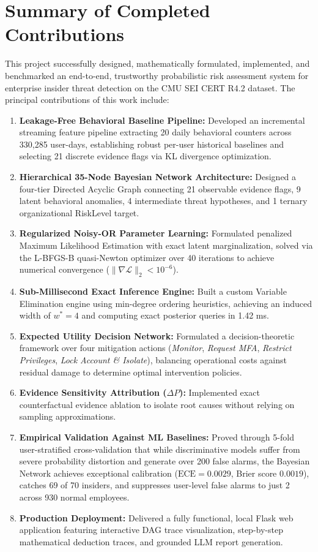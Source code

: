 \documentclass[12pt,a4paper]{report}
\begin{document}
\section{Summary of Completed Contributions}
This project successfully designed, mathematically formulated, implemented, and benchmarked an end-to-end, trustworthy probabilistic risk assessment system for enterprise insider threat detection on the CMU SEI CERT R4.2 dataset. The principal contributions of this work include:
\begin{enumerate}
    \item \textbf{Leakage-Free Behavioral Baseline Pipeline:} Developed an incremental streaming feature pipeline extracting 20 daily behavioral counters across 330,285 user-days, establishing robust per-user historical baselines and selecting 21 discrete evidence flags via KL divergence optimization.
    \item \textbf{Hierarchical 35-Node Bayesian Network Architecture:} Designed a four-tier Directed Acyclic Graph connecting 21 observable evidence flags, 9 latent behavioral anomalies, 4 intermediate threat hypotheses, and 1 ternary organizational RiskLevel target.
    \item \textbf{Regularized Noisy-OR Parameter Learning:} Formulated penalized Maximum Likelihood Estimation with exact latent marginalization, solved via the L-BFGS-B quasi-Newton optimizer over 40 iterations to achieve numerical convergence ($\|\nabla \mathcal{L}\|_2 < 10^{-6}$).
    \item \textbf{Sub-Millisecond Exact Inference Engine:} Built a custom Variable Elimination engine using min-degree ordering heuristics, achieving an induced width of $w^* = 4$ and computing exact posterior queries in 1.42 ms.
    \item \textbf{Expected Utility Decision Network:} Formulated a decision-theoretic framework over four mitigation actions (\textit{Monitor}, \textit{Request MFA}, \textit{Restrict Privileges}, \textit{Lock Account \& Isolate}), balancing operational costs against residual damage to determine optimal intervention policies.
    \item \textbf{Evidence Sensitivity Attribution ($\Delta P$):} Implemented exact counterfactual evidence ablation to isolate root causes without relying on sampling approximations.
    \item \textbf{Empirical Validation Against ML Baselines:} Proved through 5-fold user-stratified cross-validation that while discriminative models suffer from severe probability distortion and generate over 200 false alarms, the Bayesian Network achieves exceptional calibration ($\text{ECE} = 0.0029$, Brier score $0.0019$), catches 69 of 70 insiders, and suppresses user-level false alarms to just 2 across 930 normal employees.
    \item \textbf{Production Deployment:} Delivered a fully functional, local Flask web application featuring interactive DAG trace visualization, step-by-step mathematical deduction traces, and grounded LLM report generation.
\end{enumerate}
\end{document}
